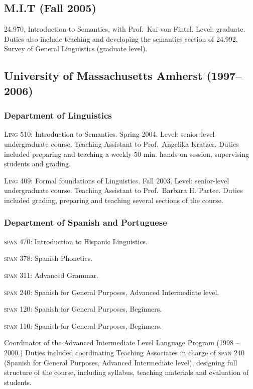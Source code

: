 \documentclass[11pt]{article}
\begin{document}
\subsection*{ M.I.T (Fall 2005)}

\textsc{24.970}, Introduction to Semantics, with Prof.\ Kai von
Fintel. Level: graduate. Duties also include teaching and developing
the semantics section of 24.992, Survey of General Linguistics
(graduate level).

\subsection*{University of Massachusetts Amherst (1997-- 2006)}

\subsubsection*{Department of Linguistics}

\textsc{Ling 510:} Introduction to Semantics. Spring 2004. Level:
senior-level undergraduate course. Teaching Assistant to Prof.\
Angelika Kratzer. Duties included preparing and teaching a weekly 50 min. hands-on session, supervising students and grading.

\textsc{Ling 409:} Formal foundations of Linguistics. Fall
2003. Level: senior-level undergraduate course. Teaching Assistant to
Prof.\ Barbara H. Partee. Duties included grading, preparing and teaching several sections of the course. 

\subsubsection*{Department of Spanish and Portuguese}

\textsc{span 470}: Introduction to Hispanic Linguistics.

\textsc{span 378}: Spanish Phonetics. 

\textsc{span 311}: Advanced Grammar. 

\textsc{span 240}: Spanish for General Purposes, Advanced Intermediate level.

\textsc{span 120}:  Spanish for General Purposes, Beginners.

 \textsc{span 110}: Spanish for General Purposes, Beginners.


 Coordinator of the Advanced Intermediate Level Language Program (1998
 -- 2000.) Duties included coordinating Teaching Associates in charge
 of \textsc{span} 240 (Spanish for General Purposes, Advanced
 Intermediate level), designing full structure of the course,
 including syllabus, teaching materials and evaluation of students.
\end{document}
